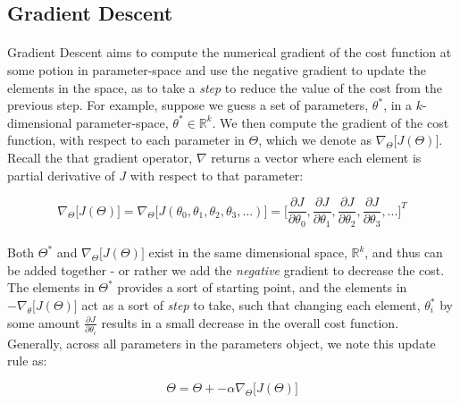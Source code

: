 \documentclass[12pt,letterpaper]{article}
\begin{document}

\subsection{Gradient Descent}

\paragraph*{}Gradient Descent aims to compute the numerical gradient of the cost function at some potion in parameter-space and use the negative gradient to update the elements in the space, as to take a \textit{step} to reduce the value of the cost from the previous step. For example, suppose we guess a set of parameters, $\theta^*$, in a $k$-dimensional parameter-space, $\theta^* \in \mathbb{R}^k$. We then compute the gradient of the cost function, with respect to each parameter in $\Theta$, which we denote as $\nabla_\Theta \big[ J(\Theta) \big]$. Recall the that gradient operator, $\nabla$ returns a vector where each element is partial derivative of $J$ with respect to that parameter:

\begin{equation}
\label{cost gradient}
\nabla_\Theta \big[ J(\Theta) \big] = \nabla_\Theta \big[ J(\theta_0, \theta_1,\theta_2,\theta_3,...) \big] =
\Big[ \frac{\partial J}{\partial \theta_0}, \frac{\partial J}{\partial \theta_1}, 
		\frac{\partial J}{\partial \theta_2}, \frac{\partial J}{\partial \theta_3}, ... \Big]^T
\end{equation}

\paragraph*{}Both $\Theta^*$ and $\nabla_\Theta \big[ J(\Theta) \big]$ exist in the same dimensional space, $\mathbb{R}^k$, and thus can be added together - or rather we add the \textit{negative} gradient to decrease the cost. The elements in $\Theta^*$ provides a sort of starting point, and the elements in $-\nabla_\theta \big[ J(\Theta) \big]$ act as a sort of \textit{step} to take, such that changing each element, $\theta^*_i$ by some amount $\frac{\partial J}{\partial \theta_i}$ results in a small decrease in the overall cost function. Generally, across all parameters in the parameters object, we note this update rule as:

\begin{equation}
\label{gradient update}
\Theta = \Theta + -\alpha \nabla_\Theta \big[ J(\Theta) \big]
\end{equation}
\end{document}

